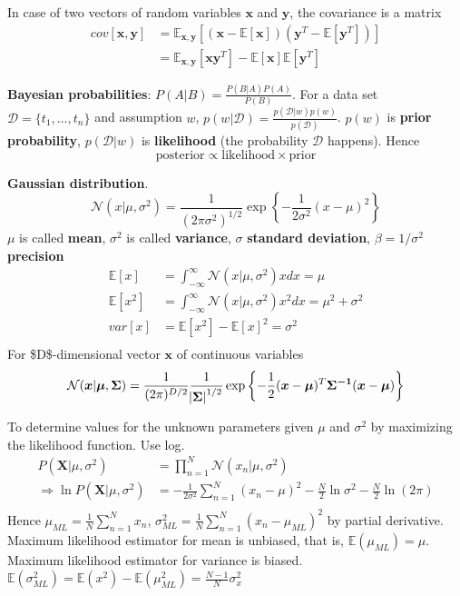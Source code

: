\documentclass[11pt]{article}
\newcommand{\bl}[1] {\boldsymbol{#1}}
\begin{document}
In case of two vectors of random variables \(\bl{x}\) and \(\bl{y}\), the
covariance is a matrix
\begin{align*}
cov[\bl{x},\bl{y}]&=\mathbb{E}_{\bl{x},\bl{y}}[(\bl{x}-\mathbb{E}[\bl{x}])(\bl{y}^T
-\mathbb{E}[\bl{y}^T])]\\
&=\mathbb{E}_{\bl{x},\bl{y}}[\bl{xy}^T]-\mathbb{E}[\bl{x}]\mathbb{E}[\bl{y}^T]
\end{align*}

\textbf{Bayesian probabilities}: \(P(A|B)=\frac{P(B|A)P(A)}{P(B)}\). For a data set 
\(\mathcal{D}=\{t_1,\dots,t_n\}\) and assumption \(w\),
\(p(w|\mathcal{D})=\frac{p(\mathcal{D}|w)p(w)}{p(\mathcal{D})}\). \(p(w)\) is
\textbf{prior probability}, \(p(\mathcal{D}|w)\) is \textbf{likelihood} (the probability
\(\mathcal{D}\) happens). Hence 
\begin{equation*}
\text{posterior}\propto\text{likelihood}\times\text{prior}
\end{equation*}

\textbf{Gaussian distribution}.
\begin{equation*}
\mathcal{N}(x|\mu,\sigma^2)=\frac{1}{(2\pi\sigma^2)^{1/2}}\exp\left\{
-\frac{1}{2\sigma^2}(x-\mu)^2\right\}
\end{equation*}
\(\mu\) is called \textbf{mean}, \(\sigma^2\) is called \textbf{variance}, \(\sigma\) \textbf{standard
deviation}, \(\beta=1/\sigma^2\) \textbf{precision}
\begin{align*}
\mathbb{E}[x]&=\int_{-\infty}^\infty\mathcal{N}(x|\mu,\sigma^2)xdx=\mu\\
\mathbb{E}[x^2]&=\int_{-\infty}^\infty\mathcal{N}(x|\mu,\sigma^2)x^2dx=\mu^2
+\sigma^2\\
var[x]&=\mathbb{E}[x^2]-\mathbb{E}[x]^2=\sigma^2\\
\end{align*}
For \$D\$-dimensional vector \(\bl{x}\) of continuous variables
\begin{equation*}
\mathcal{N}(\bl{x}|\bl{\mu},\bl{\Sigma})=\frac{1}{(2\pi)^{D/2}}\frac{1}
{\abs{\bl{\Sigma}}^{1/2}}\exp\left\{-\frac{1}{2}(\bl{x}-\bl{\mu})^T
\bl{\Sigma^{-1}}(\bl{x}-\bl{\mu})\right\}
\end{equation*}

To determine values for the unknown parameters given \(\mu\) and \(\sigma^2\) by
maximizing the likelihood function. Use log.
\begin{align*}
P(\bl{X}|\mu,\sigma^2)&=\displaystyle\prod_{n=1}^N\mathcal{N}(x_n|\mu,\sigma^2)\\
\Rightarrow \ln P(\bl{X}|\mu,\sigma^2)&=-\frac{1}{2\sigma^2}
\displaystyle\sum_{n=1}^N(x_n-\mu)^2-\frac{N}{2}\ln\sigma^2-\frac{N}{2}\ln(2\pi)\\
\end{align*}
Hence \(\mu_{ML}=\frac{1}{N}\displaystyle\sum_{n=1}^Nx_n\),
\(\sigma^2_{ML}=\frac{1}{N}\displaystyle\sum_{n=1}^N(x_n-\mu_{ML})^2\) by
partial derivative. Maximum likelihood estimator for mean is unbiased, that
is, \(\mathbb{E}(\mu_{ML})=\mu\). Maximum likelihood estimator for variance is
biased. \(\mathbb{E}(\sigma_{ML}^2)=\mathbb{E}(x^2)-\mathbb{E}(\mu_{ML}^2)=
   \frac{N-1}{N}\sigma_x^2\)
\end{document}
